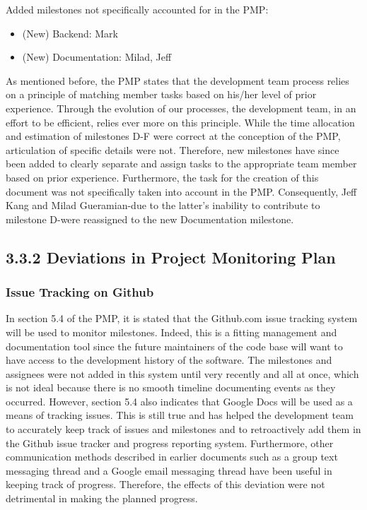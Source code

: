 \documentclass[]{article}
\begin{document}
Added milestones not specifically accounted for in the PMP:

\begin{itemize}
\itemsep1pt\parskip0pt
\item
  (New) Backend: Mark
\item
  (New) Documentation: Milad, Jeff
\end{itemize}

As mentioned before, the PMP states that the development team process
relies on a principle of matching member tasks based on his/her level of
prior experience. Through the evolution of our processes, the
development team, in an effort to be efficient, relies ever more on this
principle. While the time allocation and estimation of milestones D-F
were correct at the conception of the PMP, articulation of specific
details were not. Therefore, new milestones have since been added to
clearly separate and assign tasks to the appropriate team member based
on prior experience. Furthermore, the task for the creation of this
document was not specifically taken into account in the PMP.
Consequently, Jeff Kang and Milad Gueramian-due to the latter's
inability to contribute to milestone D-were reassigned to the new
Documentation milestone.

\subsection{3.3.2 Deviations in Project Monitoring
Plan}\label{deviations-in-project-monitoring-plan}

\subsubsection{Issue Tracking on Github}\label{issue-tracking-on-github}

In section 5.4 of the PMP, it is stated that the Github.com issue
tracking system will be used to monitor milestones. Indeed, this is a
fitting management and documentation tool since the future maintainers
of the code base will want to have access to the development history of
the software. The milestones and assignees were not added in this system
until very recently and all at once, which is not ideal because there is
no smooth timeline documenting events as they occurred. However, section
5.4 also indicates that Google Docs will be used as a means of tracking
issues. This is still true and has helped the development team to
accurately keep track of issues and milestones and to retroactively add
them in the Github issue tracker and progress reporting system.
Furthermore, other communication methods described in earlier documents
such as a group text messaging thread and a Google email messaging
thread have been useful in keeping track of progress. Therefore, the
effects of this deviation were not detrimental in making the planned
progress.
\end{document}
